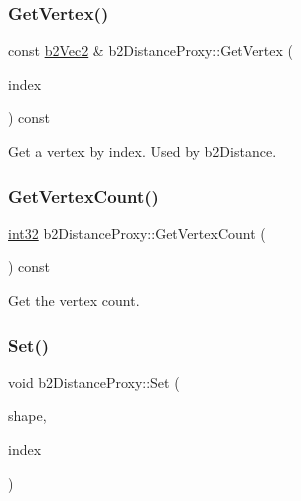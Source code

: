 \subsubsection{\texorpdfstring{GetVertex()}{GetVertex()}}
{\footnotesize\ttfamily const \mbox{\hyperlink{structb2_vec2}{b2\+Vec2}} \& b2\+Distance\+Proxy\+::\+Get\+Vertex (\begin{DoxyParamCaption}\item[{\mbox{\hyperlink{b2_settings_8h_a43d43196463bde49cb067f5c20ab8481}{int32}}}]{index }\end{DoxyParamCaption}) const\hspace{0.3cm}{\ttfamily [inline]}}



Get a vertex by index. Used by b2\+Distance. 

\mbox{\label{structb2_distance_proxy_a99c461f28d484429dac8f14b58f63d89}} 
\subsubsection{\texorpdfstring{GetVertexCount()}{GetVertexCount()}}
{\footnotesize\ttfamily \mbox{\hyperlink{b2_settings_8h_a43d43196463bde49cb067f5c20ab8481}{int32}} b2\+Distance\+Proxy\+::\+Get\+Vertex\+Count (\begin{DoxyParamCaption}{ }\end{DoxyParamCaption}) const\hspace{0.3cm}{\ttfamily [inline]}}



Get the vertex count. 

\mbox{\label{structb2_distance_proxy_a80a59a9c9e952482a8fc6db4b883365d}} 
\subsubsection{\texorpdfstring{Set()}{Set()}}
{\footnotesize\ttfamily void b2\+Distance\+Proxy\+::\+Set (\begin{DoxyParamCaption}\item[{const \mbox{\hyperlink{classb2_shape}{b2\+Shape}} $\ast$}]{shape,  }\item[{\mbox{\hyperlink{b2_settings_8h_a43d43196463bde49cb067f5c20ab8481}{int32}}}]{index }\end{DoxyParamCaption})}

